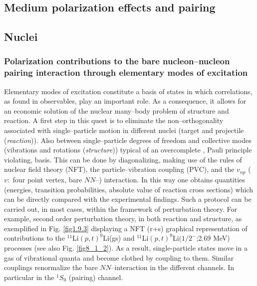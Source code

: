 




\begin{subappendices}
\section{Medium polarization effects and pairing}\label{C3AppEx}
\subsection{Nuclei}
\subsubsection{Polarization contributions to the bare nucleon--nucleon pairing interaction through elementary modes of excitation}
Elementary modes of excitation constitute a basis of states in which correlations, as found in observables, play an important role. As a consequence, it allows for an economic solution of the nuclear many--body problem of structure and reaction. A first step in this quest is to eliminate the non--orthogonality associated with single--particle motion in different nuclei (target and projectile (\textit{reaction})). Also between single--particle degrees of freedom and collective modes (vibrations and rotations (\textit{structure})) typical of an overcomplete , Pauli principle violating, basis. This can be done by diagonalizing, making use of the rules of nuclear field theory (NFT), the particle--vibration coupling (PVC), and the $v_{np}$ ($v:$ four point vertex, bare $NN$--) interaction. In this way one obtains quantities (energies, transition probabilities, absolute value of reaction cross sections) which can be directly compared with the experimental findings.
Such a protocol can be carried out, in most cases, within the framework of  perturbation theory. For example, second order perturbation theory, in both reaction and structure, as exemplified in Fig. \ref{fig1.9.3} displaying a NFT (r+s) graphical representation of contributions to the $^{11}$Li$(p,t)^{9}$Li(gs) and $^{11}$Li$(p,t)^{9}$Li$(1/2^-$;2.69 MeV) processes (see also Fig. \ref{fig8_1_2}).
As a result, single-particle states move in a gas of vibrational quanta and become clothed by coupling to them. Similar couplings renormalize the bare $NN$--interaction in the different channels. In particular in the $^1S_0$ (pairing) channel.



\end{subappendices}
